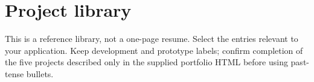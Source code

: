 \documentclass[10pt,letterpaper]{article}
\begin{document}

\section*{Project library}
This is a reference library, not a one-page resume. Select the entries relevant to your application. Keep development and prototype labels; confirm completion of the five projects described only in the supplied portfolio HTML before using past-tense bullets.
\medskip

\end{document}
